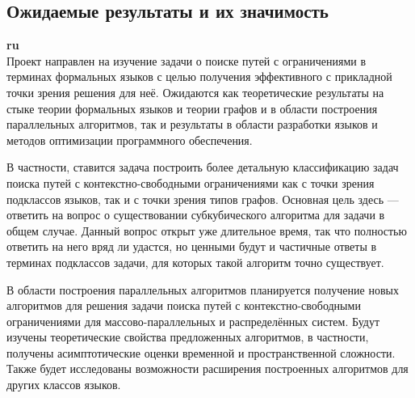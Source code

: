\documentclass[12pt]{article}  %
\theoremstyle{remark}
\begin{document}
\subsection{Ожидаемые результаты и их значимость}

\textbf{ru}\\
%
Проект направлен на изучение задачи о поиске путей с ограничениями в терминах формальных языков с целью получения эффективного с прикладной точки зрения решения для неё. Ожидаются как теоретические результаты на стыке теории формальных языков и теории графов и в области построения параллельных алгоритмов, так и результаты в области разработки языков и методов оптимизации программного обеспечения.

В частности, ставится задача построить более детальную классификацию задач поиска путей с контекстно-свободными ограничениями как с точки зрения подклассов языков, так и с точки зрения типов графов. Основная цель здесь — ответить на вопрос о существовании субкубического алгоритма для задачи в общем случае. Данный вопрос открыт уже длительное время, так что полностью ответить на него вряд ли удастся, но ценными будут и частичные ответы в терминах подклассов задачи, для которых такой алгоритм точно существует.

В области построения параллельных алгоритмов планируется получение новых алгоритмов для решения задачи поиска путей с контекстно-свободными ограничениями для массово-параллельных и распределённых систем. Будут изучены теоретические свойства предложенных алгоритмов, в частности, получены асимптотические оценки временной и пространственной сложности. Также будет исследованы возможности расширения построенных алгоритмов для других классов языков.
\end{document}
